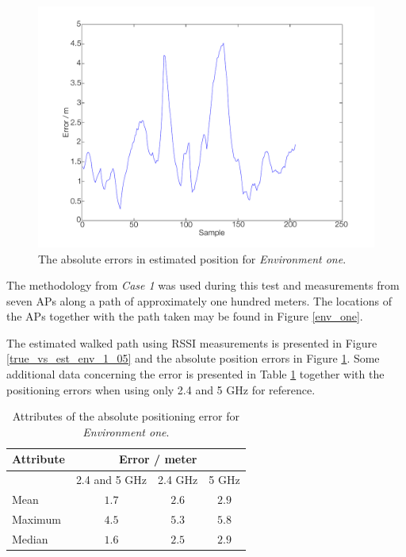 \documentclass{LTHthesis}
\begin{document}
\begin{figure}[!hbt]

\includegraphics[width=1\textwidth ]{images/pure_rssi/error_env_1_05}
\caption{The absolute errors in estimated position for \emph{Environment one}.}\label{error_env_1_05}
\end{figure}
%
The methodology from \emph{Case 1} was used during this test and measurements from seven APs along a path of approximately one hundred meters. The locations of the APs together with the path taken may be found in Figure \ref{env_one}.

The estimated walked path using RSSI measurements is presented in Figure \ref{true_vs_est_env_1_05} and the absolute position errors in Figure \ref{error_env_1_05}. Some additional data concerning the error is presented in Table \ref{table:error_env-1} together with the positioning errors when using only 2.4 and 5 GHz for reference.
%
\begin{table}[!hbt]
\begin{center}
\begin{tabular}{|l|c|c|c|}
\hline
\multicolumn{1}{|c|}{Attribute} & \multicolumn{3}{|c|}{Error / meter} \\
\hline
\multicolumn{1}{c|}{} & 2.4 and 5 GHz & 2.4 GHz & 5 GHz \\
\hline
Mean & $1.7$ & $2.6$ & $2.9$ \\
\hline
Maximum & $4.5$ & $5.3$ & $5.8$\\
\hline
Median & $1.6$ & $2.5$ & $2.9$ \\
\hline 
\end{tabular}
\end{center}
\caption{Attributes of the absolute positioning error for \emph{Environment one}.}\label{table:error_env-1}
\end{table}
\end{document}
